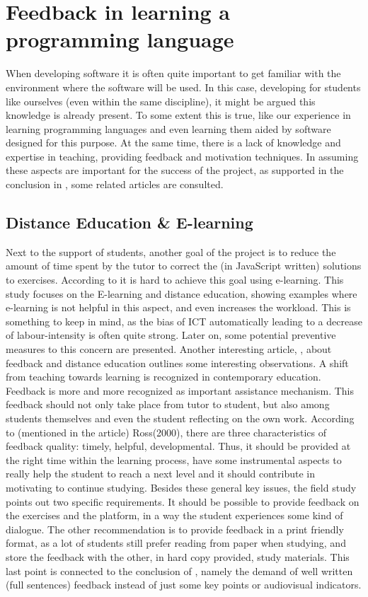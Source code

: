 \documentclass{article}
\begin{document}
\section{Feedback in learning a programming language}
When developing software it is often quite important to get familiar with the 
environment where the software will be used. In this case, developing for
students like ourselves (even within the same discipline), it might be argued
this knowledge is already present. To some extent this is true, like our
experience in learning programming languages and even learning them aided by 
software designed for this purpose. At the same time, there is a lack of
knowledge and expertise in teaching, providing feedback and 
motivation techniques. In assuming these aspects are important for the success
of the project, as supported in the conclusion in
\citep{al2009investigating}, some related articles are consulted.

\subsection{Distance Education \& E-learning}

Next to the support of students, another goal of the project is to reduce the 
amount of time spent by the tutor to correct the (in JavaScript written) 
solutions to exercises. According to
\citep{guri2005distance}
it is hard to achieve this goal using 
e-learning. This study focuses on the E-learning and distance education, 
showing
examples where e-learning is not helpful in this aspect, and even 
increases the workload. This is something to keep in mind, as the bias of 
ICT automatically leading to a decrease of labour-intensity is often quite 
strong. Later on, some potential preventive measures to this concern
are presented. \newline Another interesting article, 
\citep{ypsilandis2002feedback}
, about feedback and distance education 
outlines some interesting observations. A shift from teaching towards learning
is recognized in contemporary education. Feedback is more and more 
recognized as important assistance mechanism. This feedback should not only
take place from tutor to student, but also among students themselves and even
the student reflecting on the own work. According to (mentioned in the
article) Ross(2000), there are three characteristics of feedback quality:
timely, helpful, developmental. Thus, it
should be provided at the right time within the learning process, have some 
instrumental aspects to really help the student to reach a next level and it 
should contribute in motivating to continue studying. Besides these general 
key issues, the field study points out two specific requirements. It should be
possible to provide feedback on the exercises and the platform, in a way the
student experiences some kind of dialogue. The other
recommendation is to provide feedback in a print friendly format, as a lot of 
students still prefer reading from paper when studying, and store
the feedback with the other,
in hard copy provided, study materials. This last point is connected to the conclusion 
of \citep{shepherdgraduate}, namely the demand of well written
(full sentences) 
feedback instead of just some key points or audiovisual indicators.
\end{document}
